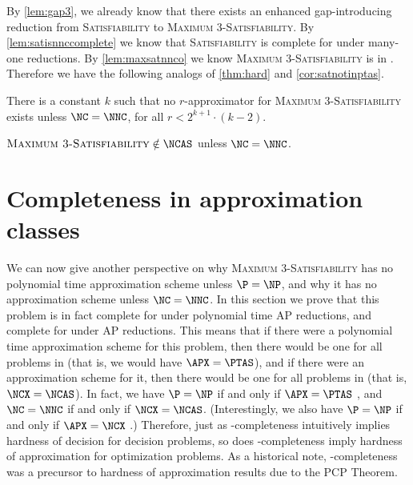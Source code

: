 \documentclass[]{article}
\begin{document}
By \autoref{lem:gap3}, we already know that there exists an \NC{} enhanced gap-introducing reduction from \textsc{Satisfiability} to \textsc{Maximum 3-Satisfiability}.
By \autoref{lem:satisnnccomplete} we know that \textsc{Satisfiability} is complete for \NNC{} under \NC{} many-one reductions.
By \autoref{lem:maxsatnnco} we know \textsc{Maximum 3-Satisfiability} is in \NNCO.
Therefore we have the following analogs of \autoref{thm:hard} and \autoref{cor:satnotinptas}.

\begin{theorem}\label{thm:nchard}
  There is a constant $k$ such that no \FNC{} $r$-approximator for \textsc{Maximum 3-Satisfiability} exists unless $\NC = \NNC$, for all $r < 2^{k + 1} \cdot (k - 2)$.
\end{theorem}

\begin{corollary}
  $\textsc{Maximum 3-Satisfiability} \notin \NCAS$ unless $\NC = \NNC$.
\end{corollary}

\section{Completeness in approximation classes}\label{sec:complete}

We can now give another perspective on why \textsc{Maximum 3-Satisfiability} has no polynomial time approximation scheme unless $\P = \NP$, and why it has no \NC{} approximation scheme unless $\NC = \NNC$.
In this section we prove that this problem is in fact complete for \APX{} under polynomial time AP reductions, and complete for \NCX{} under \NC{} AP reductions.
This means that if there were a polynomial time approximation scheme for this problem, then there would be one for all problems in \APX{} (that is, we would have $\APX = \PTAS$), and if there were an \NC{} approximation scheme for it, then there would be one for all problems in \NCX{} (that is, $\NCX = \NCAS$).
In fact, we have $\P = \NP$ if and only if $\APX = \PTAS$ \cite[Section~2]{crescenzi97}, and $\NC = \NNC$ if and only if $\NCX = \NCAS$.
(Interestingly, we also have $\P = \NP$ if and only if $\APX = \NCX$ \cite[Theorem~8.2.9]{dsst97}.)
Therefore, just as \NP-completeness intuitively implies hardness of decision for decision problems, so does \APX-completeness imply hardness of approximation for optimization problems.
As a historical note, \APX{}-completeness was a precursor to hardness of approximation results due to the PCP Theorem.
\end{document}
